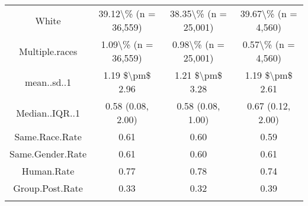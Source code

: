 \begin{table}[!htbp]
\begin{tabular}{@{\extracolsep{5pt}} cccc}
White & 39.12\textbackslash \% (n = 36,559) & 38.35\textbackslash \% (n = 25,001) & 39.67\textbackslash \% (n = 4,560) \\ 
Multiple.races & 1.09\textbackslash \% (n = 36,559) & 0.98\textbackslash \% (n = 25,001) & 0.57\textbackslash \% (n = 4,560) \\ 
mean..sd..1 & 1.19 \$\textbackslash pm\$ 2.96 & 1.21 \$\textbackslash pm\$ 3.28 & 1.19 \$\textbackslash pm\$ 2.61 \\ 
Median..IQR..1 & 0.58 (0.08, 2.00) & 0.58 (0.08, 1.00) & 0.67 (0.12, 2.00) \\ 
Same.Race.Rate & 0.61 & 0.60 & 0.59 \\ 
Same.Gender.Rate & 0.61 & 0.60 & 0.61 \\ 
Human.Rate & 0.77 & 0.78 & 0.74 \\ 
Group.Post.Rate & 0.33 & 0.32 & 0.39 \\ 
\hline \\[-1.8ex] 
\end{tabular} 
\end{table} 
